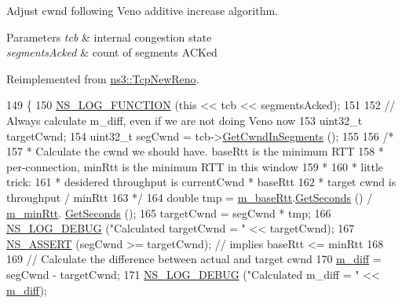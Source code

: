 Adjust cwnd following Veno additive increase algorithm. 


\begin{DoxyParams}{Parameters}
{\em tcb} & internal congestion state \\
\hline
{\em segments\+Acked} & count of segments A\+C\+Ked \\
\hline
\end{DoxyParams}


Reimplemented from \hyperlink{classns3_1_1TcpNewReno_a11db8ae90f4cebacc15524a793b0741a}{ns3\+::\+Tcp\+New\+Reno}.


\begin{DoxyCode}
149 \{
150   \hyperlink{log-macros-disabled_8h_a90b90d5bad1f39cb1b64923ea94c0761}{NS\_LOG\_FUNCTION} (\textcolor{keyword}{this} << tcb << segmentsAcked);
151 
152   \textcolor{comment}{// Always calculate m\_diff, even if we are not doing Veno now}
153   uint32\_t targetCwnd;
154   uint32\_t segCwnd = tcb->\hyperlink{classns3_1_1TcpSocketState_ab6dfe309ca53fd3207dcafede75ad12d}{GetCwndInSegments} ();
155 
156   \textcolor{comment}{/*}
157 \textcolor{comment}{   * Calculate the cwnd we should have. baseRtt is the minimum RTT}
158 \textcolor{comment}{   * per-connection, minRtt is the minimum RTT in this window}
159 \textcolor{comment}{   *}
160 \textcolor{comment}{   * little trick:}
161 \textcolor{comment}{   * desidered throughput is currentCwnd * baseRtt}
162 \textcolor{comment}{   * target cwnd is throughput / minRtt}
163 \textcolor{comment}{   */}
164   \textcolor{keywordtype}{double} tmp = \hyperlink{classns3_1_1TcpVeno_aeae3dd21752b2d7dd774202fe8a6d5e1}{m\_baseRtt}.\hyperlink{classns3_1_1Time_a8f20d5c3b0902d7b4320982f340b57c8}{GetSeconds} () / \hyperlink{classns3_1_1TcpVeno_a9fd4b7308b7f0b7cd4179d6f65aba383}{m\_minRtt}.
      \hyperlink{classns3_1_1Time_a8f20d5c3b0902d7b4320982f340b57c8}{GetSeconds} ();
165   targetCwnd = segCwnd * tmp;
166   \hyperlink{group__logging_ga413f1886406d49f59a6a0a89b77b4d0a}{NS\_LOG\_DEBUG} (\textcolor{stringliteral}{"Calculated targetCwnd = "} << targetCwnd);
167   \hyperlink{assert_8h_a6dccdb0de9b252f60088ce281c49d052}{NS\_ASSERT} (segCwnd >= targetCwnd); \textcolor{comment}{// implies baseRtt <= minRtt}
168 
169   \textcolor{comment}{// Calculate the difference between actual and target cwnd}
170   \hyperlink{classns3_1_1TcpVeno_ae98841fe53c815c3d754675d2857ac80}{m\_diff} = segCwnd - targetCwnd;
171   \hyperlink{group__logging_ga413f1886406d49f59a6a0a89b77b4d0a}{NS\_LOG\_DEBUG} (\textcolor{stringliteral}{"Calculated m\_diff = "} << \hyperlink{classns3_1_1TcpVeno_ae98841fe53c815c3d754675d2857ac80}{m\_diff});

\end{DoxyCode}
